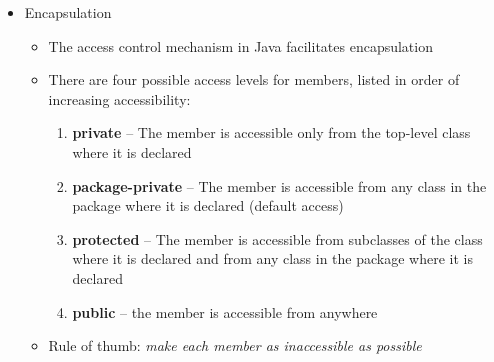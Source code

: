 \begin{itemize}
	\item Encapsulation
	\begin{itemize}
		\item The access control mechanism in Java facilitates encapsulation
		\item There are four possible access levels for members, listed in order of
		increasing accessibility:
		\begin{enumerate}
			\item \textbf{private} -- The member is accessible only from the top-level class where it is declared
			\item \textbf{package-private} -- The member is accessible from any class in the package where it is declared (default access)
			\item \textbf{protected} -- The member is accessible from subclasses of the class where it is declared and from any class in the package where it is declared
			\item \textbf{public} --  the member is accessible from anywhere
		\end{enumerate}
		\item Rule of thumb: \textit{make each member as inaccessible as possible}
	\end{itemize}
\end{itemize}
